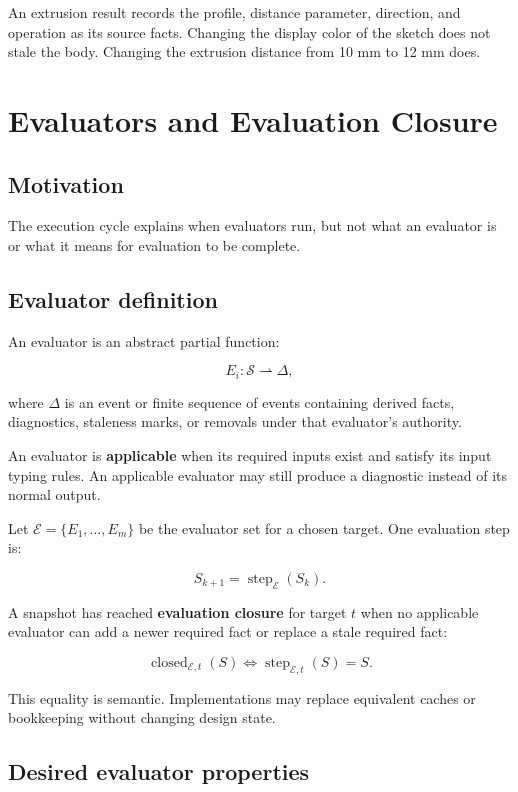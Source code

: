 \documentclass[11pt]{article}
\begin{document}
An extrusion result records the profile, distance parameter, direction, and
operation as its source facts. Changing the display color of the sketch does not
stale the body. Changing the extrusion distance from 10 mm to 12 mm does.

\section{Evaluators and Evaluation Closure}

\subsection{Motivation}

The execution cycle explains when evaluators run, but not what an evaluator is
or what it means for evaluation to be complete.

\subsection{Evaluator definition}

An evaluator is an abstract partial function:

\[
E_i:\mathcal{S}\rightharpoonup\Delta,
\]

where $\Delta$ is an event or finite sequence of events containing derived
facts, diagnostics, staleness marks, or removals under that evaluator's
authority.

An evaluator is \textbf{applicable} when its required inputs exist and satisfy
its input typing rules. An applicable evaluator may still produce a diagnostic
instead of its normal output.

Let $\mathcal{E}=\{E_1,\ldots,E_m\}$ be the evaluator set for a chosen target.
One evaluation step is:

\[
S_{k+1}=\operatorname{step}_{\mathcal{E}}(S_k).
\]

A snapshot has reached \textbf{evaluation closure} for target $t$ when no
applicable evaluator can add a newer required fact or replace a stale required
fact:

\[
\operatorname{closed}_{\mathcal{E},t}(S)
\iff
\operatorname{step}_{\mathcal{E},t}(S)=S.
\]

This equality is semantic. Implementations may replace equivalent caches or
bookkeeping without changing design state.

\subsection{Desired evaluator properties}
\end{document}
